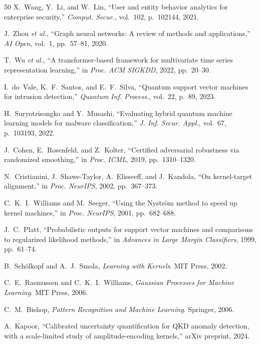 \documentclass[twocolumn,a4paper,11pt]{article}
\begin{document}
\begin{thebibliography}{50}
X.~Wang, Y.~Li, and W.~Lin,
``User and entity behavior analytics for enterprise security,''
\textit{Comput. Secur.}, vol.~102, p.~102144, 2021.

J.~Zhou \textit{et al.},
``Graph neural networks: A review of methods and applications,''
\textit{AI Open}, vol.~1, pp.~57--81, 2020.

T.~Wu \textit{et al.},
``A transformer-based framework for multivariate time series representation
learning,'' in \textit{Proc. ACM SIGKDD}, 2022, pp.~20--30.

I.~do~Vale, K.~F.~Santos, and E.~F.~Silva,
``Quantum support vector machines for intrusion detection,''
\textit{Quantum Inf. Process.}, vol.~22, p.~89, 2023.

H.~Suryotrisongko and Y.~Musashi,
``Evaluating hybrid quantum machine learning models for malware classification,''
\textit{J. Inf. Secur. Appl.}, vol.~67, p.~103193, 2022.

J.~Cohen, E.~Rosenfeld, and Z.~Kolter,
``Certified adversarial robustness via randomized smoothing,''
in \textit{Proc. ICML}, 2019, pp.~1310--1320.

N.~Cristianini, J.~Shawe-Taylor, A.~Elisseeff, and J.~Kandola,
``On kernel-target alignment,'' in \textit{Proc. NeurIPS}, 2002, pp.~367--373.

C.~K.~I.~Williams and M.~Seeger,
``Using the Nystr\"om method to speed up kernel machines,''
in \textit{Proc. NeurIPS}, 2001, pp.~682--688.

J.~C.~Platt,
``Probabilistic outputs for support vector machines and comparisons to regularized
likelihood methods,'' in \textit{Advances in Large Margin Classifiers}, 1999,
pp.~61--74.

B.~Sch\"olkopf and A.~J.~Smola,
\textit{Learning with Kernels}. MIT Press, 2002.

C.~E.~Rasmussen and C.~K.~I.~Williams,
\textit{Gaussian Processes for Machine Learning}. MIT Press, 2006.

C.~M.~Bishop,
\textit{Pattern Recognition and Machine Learning}. Springer, 2006.

A.~Kapoor,
``Calibrated uncertainty quantification for QKD anomaly detection, with a scale-limited study of amplitude-encoding kernels,'' arXiv preprint, 2024.

\end{thebibliography}
\end{document}
